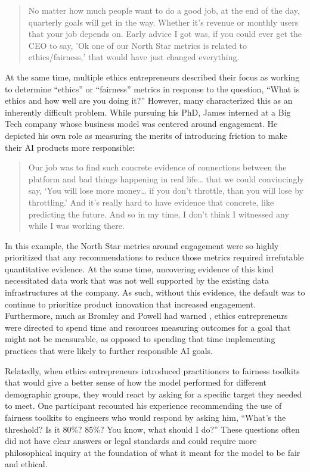 \documentclass[sigconf]{acmart}
\begin{document}
\begin{quote}
    No matter how much people want to do a good job, at the end of the day, quarterly goals will get in the way. Whether it’s revenue or monthly users that your job depends on. Early advice I got was, if you could ever get the CEO to say, 'Ok one of our North Star metrics is related to ethics/fairness,' that would have just changed everything.

\end{quote}

At the same time, multiple ethics entrepreneurs described their focus as working to determine “ethics” or “fairness” metrics in response to the question, “What is ethics and how well are you doing it?” However, many characterized this as an inherently difficult problem. While pursuing his PhD, James interned at a Big Tech company whose business model was centered around engagement. He depicted his own role as measuring the merits of introducing friction to make their AI products more responsible:

\begin{quote}
    Our job was to find such concrete evidence of connections between the platform and bad things happening in real life… that we could convincingly say, ‘You will lose more money… if you don’t throttle, than you will lose by throttling.' And it’s really hard to have evidence that concrete, like predicting the future. And so in my time, I don’t think I witnessed any while I was working there.

\end{quote}


In this example, the North Star metrics around engagement were so highly prioritized that any recommendations to reduce those metrics required irrefutable quantitative evidence. At the same time, uncovering evidence of this kind necessitated data work that was not well supported by the existing data infrastructures at the company. As such, without this evidence, the default was to continue to prioritize product innovation that increased engagement. Furthermore, much as Bromley and Powell had warned \cite{bromley_smoke_2012}, ethics entrepreneurs were directed to spend time and resources measuring outcomes for a goal that might not be measurable, as opposed to spending that time implementing practices that were likely to further responsible AI goals.

Relatedly, when ethics entrepreneurs introduced practitioners to fairness toolkits that would give a better sense of how the model performed for different demographic groups, they would react by asking for a specific target they needed to meet. One participant recounted his experience recommending the use of fairness toolkits to engineers who would respond by asking him, “What's the threshold? Is it 80\%? 85\%? You know, what should I do?” These questions often did not have clear answers or legal standards and could require more philosophical inquiry at the foundation of what it meant for the model to be fair and ethical.
\end{document}

